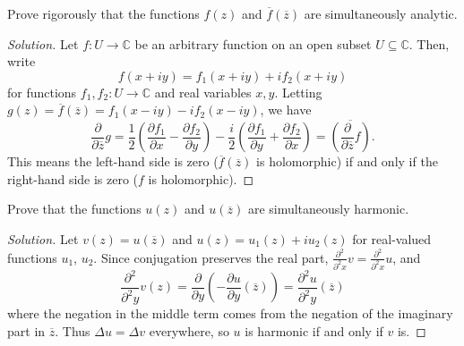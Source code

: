 \documentclass[10pt]{article}
\providecommand{\ol}{\overline}
\providecommand{\half}{\frac{1}{2}}
\providecommand{\CC}{\mathbb C}
\newenvironment{soln}{\begin{proof}[Solution]}{\end{proof}}
\begin{document}
\begin{problem}
    [p.28\#5]
    Prove rigorously that the functions $f(z)$ and
    $\ol f(\ol z)$ are simultaneously analytic.
\end{problem}

\begin{soln}
    Let $f\colon U\to\CC$ be an arbitrary function on
    an open subset $U\subseteq\CC$. Then, write
    \begin{equation*}
        f(x+iy) = f_1(x+iy) + if_2(x+iy)
    \end{equation*}
    for functions $f_1,f_2\colon U\to\CC$ and real variables $x,y$.
    Letting $g(z) = \ol f(\ol z) = f_1(x-iy) - if_2(x-iy)$, we have
    \begin{equation*}
	\frac\partial{\partial\ol z}g
	= \half\left(
	\frac{\partial f_1}{\partial x} - \frac{\partial f_2}{\partial y}
        \right)
	- \frac i2\left(
	\frac{\partial f_1}{\partial y} + \frac{\partial f_2}{\partial x}
        \right)
	= \ol{\left(\frac{\partial}{\partial \ol z}f\right)}.
    \end{equation*}
    This means the left-hand side is zero ($\ol f(\ol z)$ is holomorphic)
    if and only if the right-hand side is zero ($f$ is holomorphic).
\end{soln}

\begin{problem}
    [p.28\#6]
    Prove that the functions $u(z)$ and $u(\ol z)$ are
    simultaneously harmonic.
\end{problem}

\begin{soln}
    Let $v(z) = u(\ol z)$ and $u(z) = u_1(z) + iu_2(z)$
    for real-valued functions $u_1$, $u_2$.
    Since conjugation preserves the real part,
    $\frac{\partial^2}{\partial^2 x}v = \frac{\partial^2}{\partial^2 x}u$,
    and
    \begin{equation*}
	\frac{\partial^2}{\partial^2 y}v(z)
	= \frac{\partial}{\partial y}\left(-\frac{\partial u}{\partial y}
	(\ol z)\right) = \frac{\partial^2u}{\partial^2y}(\ol z)
    \end{equation*}
    where the negation in the middle term
    comes from the negation of the imaginary part in $\ol z$.
    Thus $\Delta u = \Delta v$ everywhere, so $u$ is harmonic
    if and only if $v$ is.
\end{soln}
\end{document}
